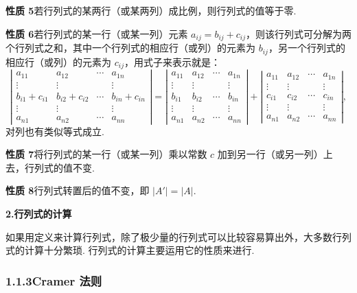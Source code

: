 \documentclass[UTF8,12pt,a4paper,fontset=fandol]{ctexart}
\begin{document}
\noindent\textbf{性质 5}\quad 若行列式的某两行（或某两列）成比例，则行列式的值等于零.

\noindent\textbf{性质 6}\quad 若行列式的某一行（或某一列）元素 $a_{ij}=b_{ij}+c_{ij}$，则该行列式可分解为两个行列式之和，其中一个行列式的相应行（或列）的元素为 $b_{ij}$，另一个行列式的相应行（或列）的元素为 $c_{ij}$，用式子来表示就是：
\[
\left|\begin{array}{ccccc}
a_{11} & a_{12} & \cdots & a_{1n}\\
\vdots & \vdots &        & \vdots\\
b_{i1}+c_{i1} & b_{i2}+c_{i2} & \cdots & b_{in}+c_{in}\\
\vdots & \vdots &        & \vdots\\
a_{n1} & a_{n2} & \cdots & a_{nn}
\end{array}\right|
=
\left|\begin{array}{ccccc}
a_{11} & a_{12} & \cdots & a_{1n}\\
\vdots & \vdots &        & \vdots\\
b_{i1} & b_{i2} & \cdots & b_{in}\\
\vdots & \vdots &        & \vdots\\
a_{n1} & a_{n2} & \cdots & a_{nn}
\end{array}\right|
+
\left|\begin{array}{ccccc}
a_{11} & a_{12} & \cdots & a_{1n}\\
\vdots & \vdots &        & \vdots\\
c_{i1} & c_{i2} & \cdots & c_{in}\\
\vdots & \vdots &        & \vdots\\
a_{n1} & a_{n2} & \cdots & a_{nn}
\end{array}\right|,
\]
对列也有类似等式成立.

\noindent\textbf{性质 7}\quad 将行列式的某一行（或某一列）乘以常数 $c$ 加到另一行（或另一列）上去，行列式的值不变.

\noindent\textbf{性质 8}\quad 行列式转置后的值不变，即 $|A'|=|A|$.

\noindent\textbf{2.\quad 行列式的计算}

如果用定义来计算行列式，除了极少量的行列式可以比较容易算出外，大多数行列式的计算十分繁琐. 行列式的计算主要运用它的性质来进行.

\subsubsection*{1.1.3\quad Cramer 法则}
\end{document}
